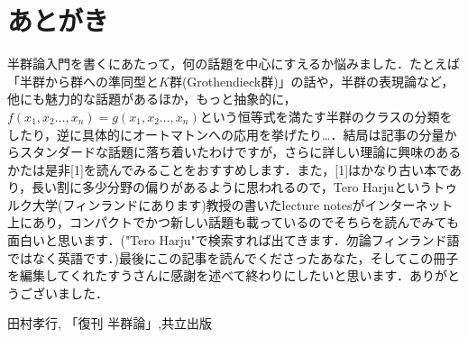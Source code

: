 \documentclass{jsarticle}
\begin{document}
\section*{あとがき}
半群論入門を書くにあたって，何の話題を中心にすえるか悩みました．たとえば「半群から群への準同型と$K$群(Grothendieck群)」の話や，半群の表現論など，他にも魅力的な話題があるほか，もっと抽象的に，$f(x_1,x_2\dots,x_n)=g(x_1,x_2\dots,x_n)$という恒等式を満たす半群のクラスの分類をしたり，逆に具体的にオートマトンへの応用を挙げたり…．結局は記事の分量からスタンダードな話題に落ち着いたわけですが，さらに詳しい理論に興味のあるかたは是非[1]を読んでみることをおすすめします．また，[1]はかなり古い本であり，長い割に多少分野の偏りがあるように思われるので，Tero Harjuというトゥルク大学(フィンランドにあります)教授の書いたlecture notesがインターネット上にあり，コンパクトでかつ新しい話題も載っているのでそちらを読んでみても面白いと思います．("Tero Harju"で検索すれば出てきます．勿論フィンランド語ではなく英語です．)最後にこの記事を読んでくださったあなた，そしてこの冊子を編集してくれたすうさんに感謝を述べて終わりにしたいと思います．ありがとうございました．
\begin{thebibliography}{9}
  田村孝行, 「復刊 半群論」,共立出版
\end{thebibliography}
\end{document}
